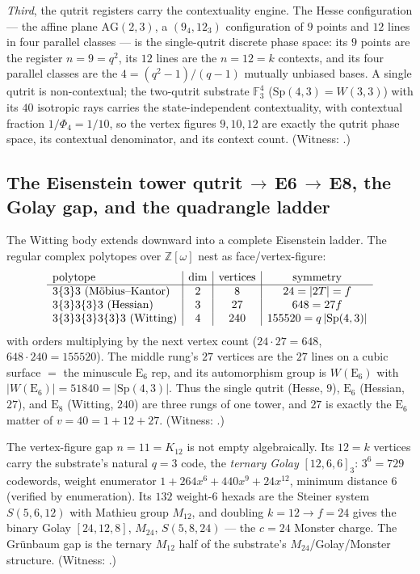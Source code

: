 \documentclass[11pt]{article}
\begin{document}
\emph{Third}, the qutrit registers carry the contextuality engine. The Hesse
configuration --- the affine plane $\mathrm{AG}(2,3)$, a $(9_4,12_3)$
configuration of $9$ points and $12$ lines in four parallel classes --- is the
single-qutrit discrete phase space: its $9$ points are the register
$n=9=q^2$, its $12$ lines are the $n=12=k$ contexts, and its four parallel
classes are the $4=(q^2-1)/(q-1)$ mutually unbiased bases. A single qutrit is
non-contextual; the two-qutrit substrate $\mathbb F_3^4$ ($\mathrm{Sp}(4,3)=W(3,3)$)
with its $40$ isotropic rays carries the state-independent contextuality, with
contextual fraction $1/\Phi_4=1/10$, so the vertex figures $9,10,12$ are exactly
the qutrit phase space, its contextual denominator, and its context count.
(Witness: .)

\subsection{The Eisenstein tower qutrit\,\texorpdfstring{$\to$}{->}\,E6\,\texorpdfstring{$\to$}{->}\,E8, the Golay gap, and the quadrangle ladder}

The Witting body extends downward into a complete Eisenstein ladder. The regular
complex polytopes over $\mathbb Z[\omega]$ nest as face/vertex-figure:
\[
\begin{array}{l|c|c|c}
\hbox{polytope} & \dim & \hbox{vertices} & \hbox{symmetry}\\
\hline
3\{3\}3\ (\hbox{M\"obius--Kantor}) & 2 & 8 & 24=|2T|=f\\
3\{3\}3\{3\}3\ (\hbox{Hessian}) & 3 & 27 & 648=27f\\
3\{3\}3\{3\}3\{3\}3\ (\hbox{Witting}) & 4 & 240 & 155520=q\,|\mathrm{Sp}(4,3)|
\end{array}
\]
with orders multiplying by the next vertex count ($24\cdot27=648$,
$648\cdot240=155520$). The middle rung's $27$ vertices are the $27$ lines on a
cubic surface $=$ the minuscule $\mathrm E_6$ rep, and its automorphism group is
$W(\mathrm E_6)$ with $|W(\mathrm E_6)|=51840=|\mathrm{Sp}(4,3)|$. Thus the
single qutrit (Hesse, $9$), $\mathrm E_6$ (Hessian, $27$), and $\mathrm E_8$
(Witting, $240$) are three rungs of one tower, and $27$ is exactly the
$\mathrm E_6$ matter of $v=40=1+12+27$. (Witness:
.)

The vertex-figure gap $n=11=K_{12}$ is not empty algebraically. Its $12=k$
vertices carry the substrate's natural $q=3$ code, the \emph{ternary Golay}
$[12,6,6]_3$: $3^6=729$ codewords, weight enumerator
$1+264x^6+440x^9+24x^{12}$, minimum distance $6$ (verified by enumeration). Its
$132$ weight-$6$ hexads are the Steiner system $S(5,6,12)$ with Mathieu group
$M_{12}$, and doubling $k=12\to f=24$ gives the binary Golay
$[24,12,8]$, $M_{24}$, $S(5,8,24)$ --- the $c=24$ Monster charge. The Gr\"unbaum
gap is the ternary $M_{12}$ half of the substrate's $M_{24}$/Golay/Monster
structure. (Witness: .)
\end{document}

